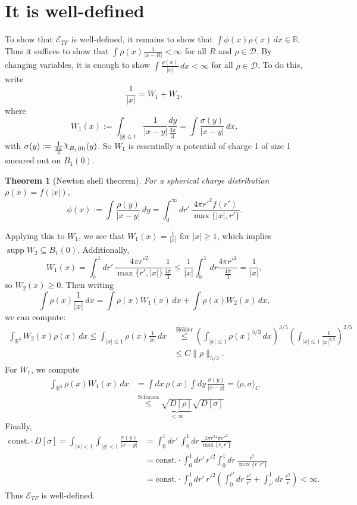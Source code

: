 \documentclass[11pt]{amsart}
\newcommand{\R}{\mathbb{R}}
\DeclareRobustCommand{\Chi}{{\mathpalette\irchi\relax}}
\newcommand{\irchi}[2]{\raisebox{\depth}{$#1\chi$}} %
\newtheorem{thm}{Theorem}
\theoremstyle{definition}
\theoremstyle{definition}
\theoremstyle{definition}
\numberwithin{equation}{section}
\begin{document}
\section{It is well-defined}
To show that $\mathcal{E}_{TF}$ is well-defined, it remains to show that $\int\phi(x)\rho(x)\,dx\in\R$. Thus it suffices to show that $\int \rho(x)\frac{1}{|x-R|}<\infty$ for all $R$ and $\rho\in\mathcal{D}$. By changing variables, it is enough to show $\int\frac{\rho(x)}{|x|}\,dx<\infty$ for all $\rho\in\mathcal{D}$. To do this, write
\[
\frac{1}{|x|}=W_1+W_2,
\]
where
\[
W_1(x):=\int_{|y|\le1}\frac{1}{|x-y|}\frac{dy}{\frac{4\pi}{3}}=\int\frac{\sigma(y)}{|x-y|}\,dx,
\]
with $\sigma(y):=\frac{1}{\frac{4\pi}{3}}\Chi_{B_1(0)}(y)$. So $W_1$ is essentially a potential of charge 1 of size 1 smeared out on $B_1(0)$.
\begin{thm}[Newton shell theorem]\label{thm:newton}
For a spherical charge distribution $\rho(x)=f(|x|)$,
\begin{equation}
\phi(x):=\int\frac{\rho(y)}{|x-y|}\,dy=\int_0^\infty dr'\,\frac{4\pi r'^2f(r')}{\max\{|x|,r'\}}.
\end{equation}
\end{thm}
Applying this to $W_1$, we see that $W_1(x)=\frac{1}{|x|}$ for $|x|\ge1$, which implies $\operatorname{supp}W_2\subseteq B_1(0)$.  Additionally,
\[
W_1(x)=\int_0^1dr'\,\frac{4\pi r'^2}{\max\{r',|x|\}}\frac{1}{\frac{4\pi}{3}}\le\frac{1}{|x|}\int_0^1\,dr\frac{4\pi r'^2}{\frac{4\pi}{3}}=\frac{1}{|x|},
\]
so $W_2(x)\ge0$.
Then writing
\begin{equation}
\int\rho(x)\frac{1}{|x|}\,dx=\int\rho(x)W_1(x)\,dx+\int\rho(x)W_2(x)\,dx,
\end{equation}
we can compute:
\begin{align*}
\int_{\R^3}W_2(x)\rho(x)\,dx\le\int_{|x|\le1}\rho(x)\frac{1}{|x|}\,dx&\stackrel{\text{H\"older}}{\le}\left(\int_{|x|\le1}\rho(x)^{5/3}\,dx\right)^{3/5}\left(\int_{|x|\le1}\frac{1}{|x|^{5/2}}\right)^{2/5}\\
&\le C\|\rho\|_{5/3}.
\end{align*}
For $W_1$, we compute
\begin{align*}
\int_{\R^3}\rho(x)W_1(x)\,dx&=\int dx\,\rho(x)\int dy\,\frac{\sigma(y)}{|x-y|}=\langle\rho,\sigma\rangle_C\\
&\stackrel{\text{Schwarz}}{\le}\underbrace{\sqrt{D[\rho]}}_{<\infty}\sqrt{D[\sigma]}
\end{align*}
Finally,
\begin{align*}
\text{const.}\cdot D[\sigma]=\int_{|x|<1}\int_{|y|<1}\frac{\sigma(y)}{|x-y|}&=\int_0^1 dr'\,\int_0^1 dr\,\frac{4\pi r^24\pi r'^2}{\max\{r,r'\}}\\
&=\text{const.}\cdot\int_0^1 dr'\,r'^2\int_0^1 dr\,\frac{r^2}{\max\{r,r'\}}\\
&=\text{const.}\cdot\int_0^1 dr'\,r'^2\left(\int_0^{r'}dr\,\frac{r^2}{r'}+\int_{r'}^1 dr\,\frac{r^2}{r}\right)<\infty.
\end{align*}
Thus $\mathcal{E}_{TF}$ is well-defined.
\end{document}

